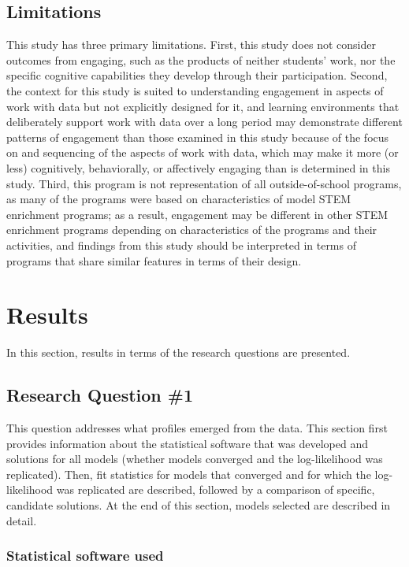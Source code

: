 \documentclass[]{msu-thesis}
\theoremstyle{definition}
\theoremstyle{definition}
\theoremstyle{definition}
\theoremstyle{remark}
\begin{document}
\section{Limitations}\label{limitations}

This study has three primary limitations. First, this study does not
consider outcomes from engaging, such as the products of neither
students' work, nor the specific cognitive capabilities they develop
through their participation. Second, the context for this study is
suited to understanding engagement in aspects of work with data but not
explicitly designed for it, and learning environments that deliberately
support work with data over a long period may demonstrate different
patterns of engagement than those examined in this study because of the
focus on and sequencing of the aspects of work with data, which may make
it more (or less) cognitively, behaviorally, or affectively engaging
than is determined in this study. Third, this program is not
representation of all outside-of-school programs, as many of the
programs were based on characteristics of model STEM enrichment
programs; as a result, engagement may be different in other STEM
enrichment programs depending on characteristics of the programs and
their activities, and findings from this study should be interpreted in
terms of programs that share similar features in terms of their design.

\chapter{Results}\label{results}

In this section, results in terms of the research questions are
presented.

\section{Research Question \#1}\label{research-question-1}

This question addresses what profiles emerged from the data. This
section first provides information about the statistical software that
was developed and solutions for all models (whether models converged and
the log-likelihood was replicated). Then, fit statistics for models that
converged and for which the log-likelihood was replicated are described,
followed by a comparison of specific, candidate solutions. At the end of
this section, models selected are described in detail.

\subsection{Statistical software used}\label{statistical-software-used}
\end{document}
